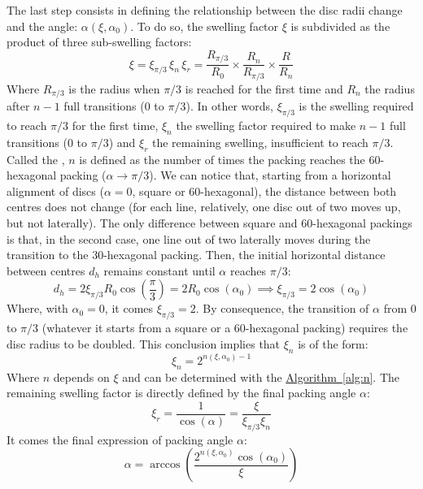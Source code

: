 \documentclass[11pt]{article}
\newcommand{\bsay}[1]{\say{\textbf{#1}}}
\newcommand{\piov}[1]{\pi/#1}
\newcommand{\piovf}[1]{\frac{\pi}{#1}}
\newcommand{\xipiov}[1]{\xi_{\piov{#1}}}
\newcommand{\Rpiov}[1]{R_{\piov{#1}}}
\newcommand{\crefalgo}[1]{\hyperref[#1]{Algorithm~\ref*{#1}}} %
\begin{document}
The last step consists in defining the relationship between the disc radii
change and the angle: $\alpha(\xi, \alpha_0)$. To do so, the swelling factor
$\xi$ is subdivided as the product of three sub-swelling factors:
\begin{equation}
	\xi = \xipiov{3} \, \xi_n \, \xi_r =
	\frac{\Rpiov{3}}{R_0} \times \frac{R_n}{\Rpiov{3}} \times
	\frac{R}{R_n}
\end{equation}
Where $\Rpiov{3}$ is the radius when $\piov{3}$ is reached for the first time
and $R_n$ the radius after $n - 1$ full transitions ($0$ to $\piov{3}$). In
other words, $\xipiov{3}$ is the swelling required to reach $\piov{3}$ for the
first time, $\xi_n$ the swelling factor required to make $n - 1$ full
transitions ($0$ to $\piov{3}$) and $\xi_r$ the remaining swelling, insufficient
to reach $\piov{3}$. Called the \bsay{transition index}, $n$ is defined as the
number of times the packing reaches the 60-hexagonal packing ($\alpha \to
\piov{3}$). We can notice that, starting from a horizontal alignment of discs
($\alpha = 0$, square or 60-hexagonal), the distance between both centres does
not change (for each line, relatively, one disc out of two moves up, but not
laterally). The only difference between square and 60-hexagonal packings is
that, in the second case, one line out of two laterally moves during the
transition to the 30-hexagonal packing. Then, the initial horizontal distance
between centres $d_h$ remains constant until $\alpha$ reaches $\piov{3}$:
\begin{equation}
	d_h = 2 \xipiov{3} R_0 \cos\left(\piovf{3}\right) = 2 R_0 \cos(\alpha_0)
	\implies \xipiov{3} = 2\cos(\alpha_0)
\end{equation}
Where, with $\alpha_0 = 0$, it comes $\xipiov{3} = 2$. By consequence, the
transition of $\alpha$ from $0$ to $\piov{3}$ (whatever it starts from a square
or a 60-hexagonal packing) requires the disc radius to be doubled. This
conclusion implies that $\xi_n$ is of the form:
\begin{equation}
	\xi_n = 2^{n(\xi,\alpha_0)-1}
\end{equation}
Where $n$ depends on $\xi$ and can be determined with the \crefalgo{alg:n}. The
remaining swelling factor is directly defined by the final packing angle
$\alpha$:
\begin{equation}
	\xi_r = \frac{1}{\cos(\alpha)} = \frac{\xi}{\xipiov{3}\xi_n}
\end{equation}
It comes the final expression of packing angle $\alpha$:
\begin{equation}
	\alpha = \arccos\left(\frac{2^{n(\xi,\alpha_0)}\cos(\alpha_0)}{\xi}\right)
	\label{equ:alpha}
\end{equation}
\end{document}
